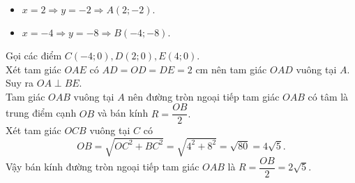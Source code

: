 \begin{bt}
{\begin{itemize}
\item $x=2 \Rightarrow y=-2 \Rightarrow A(2;-2).$
\item $x=-4 \Rightarrow y=-8 \Rightarrow B(-4;-8).$
\end{itemize}
Gọi các điểm $C(-4;0),D(2;0),E(4;0).$\\
Xét tam giác $OAE$ có $AD=OD=DE=2$ cm nên tam giác $OAD$ vuông tại $A$. Suy ra $OA \perp BE.$ \\
Tam giác $OAB$ vuông tại $A$ nên đường tròn ngoại tiếp tam giác $OAB$ có tâm là trung điểm cạnh $OB$ và bán kính $R=\dfrac{OB}{2}.$\\
Xét tam giác $OCB$ vuông tại $C$ có 
$$OB=\sqrt{OC^2+BC^2}=\sqrt{4^2+8^2}=\sqrt{80}=4\sqrt{5}.$$
Vậy bán kính đường tròn ngoại tiếp tam giác $OAB$ là $R=\dfrac{OB}{2}=2\sqrt{5}.$
}
\end{bt}

